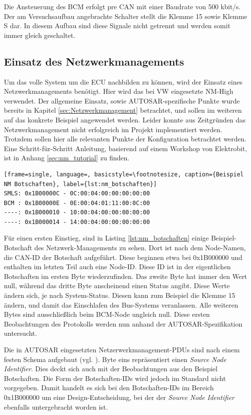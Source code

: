 \documentclass[
  a4paper,					    %
  twoside,
  DIV=calc,     				%
  bibliography=totoc,
  cleardoublepage=empty,
  ngerman,     					%
  final       					%
]{scrbook}
\begin{document}
Die Ansteuerung des BCM erfolgt pre CAN mit einer Baudrate von 500 kbit/s. Der am Versuchsaufbau angebrachte Schalter stellt die Klemme 15 sowie Klemme S dar. In diesem Aufbau sind diese Signale nicht getrennt und werden somit immer gleich geschaltet.




\subsection{Einsatz des Netzwerkmanagements}
\label{sec:AutosarNM}
Um das volle System um die ECU nachbilden zu können, wird der Einsatz eines Netzwerkmanagements benötigt. Hier wird das bei VW eingesetzte NM-High verwendet. Der allgemeine Einsatz, sowie AUTOSAR-spezifische Punkte wurde bereits in Kapitel \ref{sec:Netzwerkmanagement} betrachtet, und sollen im weiteren auf das konkrete Beispiel angewendet werden. Leider konnte aus Zeitgründen das Netzwerkmanagement nicht erfolgreich im Projekt implementiert werden. Trotzdem sollen hier alle relevanten Punkte der Konfiguration betrachtet werden. Eine Schritt-für-Schritt Anleitung, basierend auf einem Workshop von Elektrobit, ist in Anhang \ref{sec:nm_tutorial} zu finden.

\begin{lstlisting}[frame=single, language=, basicstyle=\footnotesize, caption={Beispiel NM Botschaften}, label={lst:nm_botschaften}]
SMLS: 0x1B00000C - 0C:00:04:00:00:00:00:00
BCM : 0x1B00000E - 0E:00:04:01:11:00:0C:00
----: 0x1B000010 - 10:00:04:00:00:00:00:00
----: 0x1B000014 - 14:00:04:00:00:00:00:00
\end{lstlisting}

Für einen ersten Einstieg, sind in Listing \ref{lst:nm_botschaften} einige Beispiel-Botschaft des Netzwerk-Managements zu sehen. Dort ist nach dem Node-Namen, die CAN-ID der Botschaft aufgeführt. Diese beginnen etwa bei 0x1B000000 und enthalten im letzten Teil auch eine Node-ID. Diese ID ist in der eigentlichen Botschaften im ersten Byte wiederzufinden. Das zweite Byte hat immer den Wert null, während das dritte Byte anscheinend einen Status angibt. Diese Werte ändern sich, je nach System-Status. Diesen kann zum Beispiel die Klemme 15 ändern, und damit das Einschlafen des Bus-Systems veranlassen. Alle weiteren Bytes sind ausschließlich beim BCM-Node ungleich null. Diese ersten Beobachtungen des Protokolls werden nun anhand der AUTOSAR-Spezifikation untersucht.

Die in AUTOSAR eingesetzten Netzerwerkmanagement-PDUs sind nach einem festen Schema aufgebaut (vgl. \cite[Seite 51]{autosar_cannm}). Byte eins repräsentiert einen \emph{Source Node Identifier}. Dies deckt sich auch mit der Beobachtungen aus den Beispiel Botschaften. Die Form der Botschaften-IDs wird jedoch im Standard nicht vorgegeben. Damit handelt es sich bei den Botschaften-IDs im Bereich 0x1B000000 um eine Design-Entscheidung, bei der der \emph{Source Node Identifier} ebenfalls untergebracht worden ist.
\end{document}
